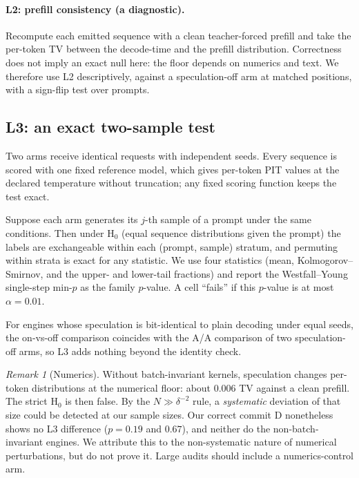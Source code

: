 \documentclass[10pt]{article}
\theoremstyle{remark}
\newtheorem{remark}{Remark}
\begin{document}
\paragraph{L2: prefill consistency (a diagnostic).} Recompute each emitted sequence with a clean teacher-forced prefill and take the per-token TV between the decode-time and the prefill distribution. Correctness does not imply an exact null here: the floor depends on numerics and text. We therefore use L2 descriptively, against a speculation-off arm at matched positions, with a sign-flip test over prompts.

\subsection{L3: an exact two-sample test}\label{sec:l3}
Two arms receive identical requests with independent seeds. Every sequence is scored with one fixed reference model, which gives per-token PIT values at the declared temperature without truncation; any fixed scoring function keeps the test exact.

Suppose each arm generates its $j$-th sample of a prompt under the same conditions. Then under H$_0$ (equal sequence distributions given the prompt) the labels are exchangeable within each (prompt, sample) stratum, and permuting within strata is exact for any statistic. We use four statistics (mean, Kolmogorov--Smirnov, and the upper- and lower-tail fractions) and report the Westfall--Young single-step min-$p$ \cite{westfallyoung1993} as the family $p$-value. A cell ``fails'' if this $p$-value is at most $\alpha=0.01$.

For engines whose speculation is bit-identical to plain decoding under equal seeds, the on-vs-off comparison coincides with the A/A comparison of two speculation-off arms, so L3 adds nothing beyond the identity check.

\begin{remark}[Numerics]\label{rem:numerics}
Without batch-invariant kernels, speculation changes per-token distributions at the numerical floor: about 0.006 TV against a clean prefill. The strict H$_0$ is then false. By the $N\gg\delta^{-2}$ rule, a \emph{systematic} deviation of that size could be detected at our sample sizes. Our correct commit D nonetheless shows no L3 difference ($p=0.19$ and $0.67$), and neither do the non-batch-invariant engines. We attribute this to the non-systematic nature of numerical perturbations, but do not prove it. Large audits should include a numerics-control arm.
\end{remark}
\end{document}
